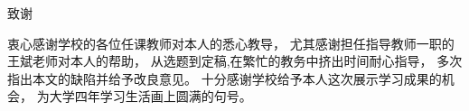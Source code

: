 \vspace{2cm}
\begin{center}
    {\heiti{}致谢}
\end{center}
\vspace{1cm}
{
    \par 衷心感谢学校的各位任课教师对本人的悉心教导，
    尤其感谢担任指导教师一职的王斌老师对本人的帮助，
    从选题到定稿,在繁忙的教务中挤出时间耐心指导，
    多次指出本文的缺陷并给予改良意见。
    十分感谢学校给予本人这次展示学习成果的机会，
    为大学四年学习生活画上圆满的句号。
}